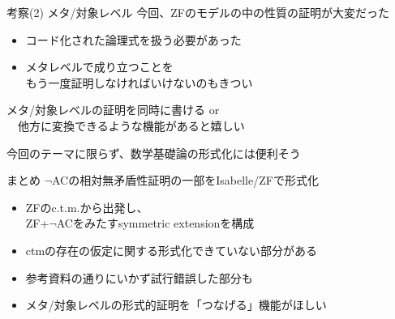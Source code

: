 \documentclass[17pt,aspectratio=169]{beamer}
\begin{document}
\begin{frame}{考察(2) メタ/対象レベル}
    今回、ZFのモデルの中の性質の証明が大変だった
    {\small 
    \begin{itemize}[itemsep=5pt]
        \item コード化された論理式を扱う必要があった
        \item メタレベルで成り立つことを\\
              もう一度証明しなければいけないのもきつい
    \end{itemize}}

    \textcolor{red}{\blacktriangleright}{\small 
    メタ/対象レベルの証明を同時に書ける or\\
    \,\,\,\,\,\,他方に変換できるような機能があると嬉しい}

    \textcolor{red}{\blacktriangleright}{\small 
    今回のテーマに限らず、数学基礎論の形式化には便利そう} 
\end{frame}

\begin{frame}{まとめ}
    $\neg$ACの相対無矛盾性証明{\small の一部}をIsabelle/ZFで形式化
    {\small
    \begin{itemize}[itemsep=8pt]
        \item ZFのc.t.m.から出発し、\\ZF+$\neg$ACをみたすsymmetric extensionを構成
        \item ctmの存在の仮定に関する形式化できていない部分がある
        \item 参考資料の通りにいかず試行錯誤した部分も
        \item メタ/対象レベルの形式的証明を「つなげる」機能がほしい
    \end{itemize}
    }
\end{frame}
\end{document}
